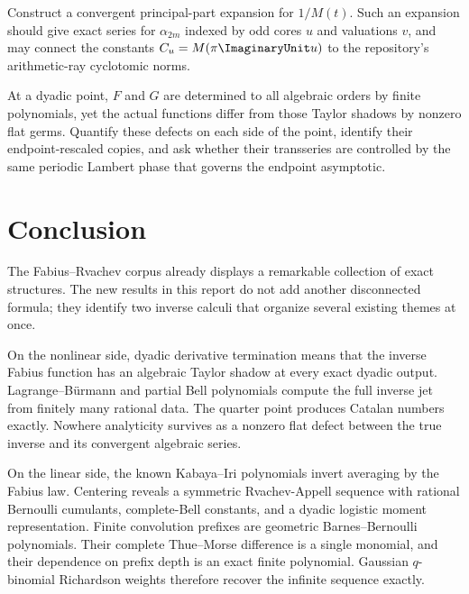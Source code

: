 \documentclass[11pt,oneside]{article}
\numberwithin{equation}{section}
\theoremstyle{definition}
\theoremstyle{remark}
\begin{document}
\begin{frontierbox}
Construct a convergent principal-part expansion for $1/M(t)$.  Such an expansion should give exact
series for $\alpha_{2m}$ indexed by odd cores $u$ and valuations $v$, and may connect the constants
$C_u=M(\pi\ImaginaryUnit u)$ to the repository's arithmetic-ray cyclotomic norms.
\end{frontierbox}

\begin{frontierbox}
At a dyadic point, $F$ and $G$ are determined to all algebraic orders by finite polynomials, yet the
actual functions differ from those Taylor shadows by nonzero flat germs.  Quantify these defects on
each side of the point, identify their endpoint-rescaled copies, and ask whether their transseries are
controlled by the same periodic Lambert phase that governs the endpoint asymptotic.
\end{frontierbox}

\section{Conclusion}

The Fabius--Rvachev corpus already displays a remarkable collection of exact structures.  The new
results in this report do not add another disconnected formula; they identify two inverse calculi
that organize several existing themes at once.

On the nonlinear side, dyadic derivative termination means that the inverse Fabius function has an
algebraic Taylor shadow at every exact dyadic output.  Lagrange--B\"urmann and partial Bell
polynomials compute the full inverse jet from finitely many rational data.  The quarter point produces
Catalan numbers exactly.  Nowhere analyticity survives as a nonzero flat defect between the true
inverse and its convergent algebraic series.

On the linear side, the known Kabaya--Iri polynomials invert averaging by the Fabius law.  Centering
reveals a symmetric Rvachev-Appell sequence with rational Bernoulli cumulants, complete-Bell
constants, and a dyadic logistic moment representation.  Finite convolution prefixes are geometric
Barnes--Bernoulli polynomials.  Their complete Thue--Morse difference is a single monomial, and
their dependence on prefix depth is an exact finite polynomial.  Gaussian $q$-binomial Richardson
weights therefore recover the infinite sequence exactly.
\end{document}
